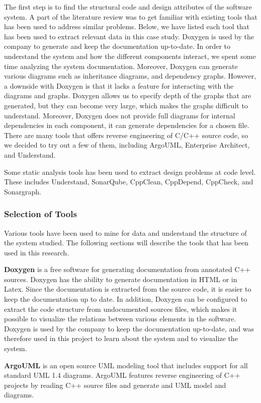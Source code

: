 The first step is to find the structural code and design attributes of the software system. A part of the literature review was to get familiar with existing tools that has been used to address similar problems. Below, we have listed each tool that has been used to extract relevant data in this case study. Doxygen is used by the company to generate and keep the documentation up-to-date. In order to understand the system and how the different components interact, we spent some time analyzing the system documentation. Moreover, Doxygen can generate various diagrams such as inheritance diagrams, and dependency graphs. However, a downside with Doxygen is that it lacks a feature for interacting with the diagrams and graphs. Doxygen allows us to specify depth of the graphs that are generated, but they can become very large, which makes the graphs difficult to understand. Moreover, Doxygen does not provide full diagrams for internal dependencies in each component, it can generate dependencies for a chosen file. There are many tools that offers reverse engineering of C/C++ source code, so we decided to try out a few of them, including ArgoUML, Enterprise Architect, and Understand. 

Some static analysis tools has been used to extract design problems at code level. These includes Understand, SonarQube, CppClean, CppDepend, CppCheck, and Sonargraph. 

\subsubsection{Selection of Tools}
Various tools have been used to mine for data and understand the structure of the system studied. The following sections will describe the tools that has been used in this research.

\textbf{Doxygen} is a free software for generating documentation from annotated C++ sources. Doxygen has the ability to generate documentation in HTML or in Latex. Since the documentation is extracted from the source code, it is easier to keep the documentation up to date. In addition, Doxygen can be configured to extract the code structure from undocumented sources files, which makes it possible to visualize the relations between various elements in the software. Doxygen is used by the company to keep the documentation up-to-date, and was therefore used in this project to learn about the system and to visualize the system.

\textbf{ArgoUML} is an open source UML modeling tool that includes support for all standard UML 1.4 diagrams\cite{argouml}. ArgoUML features reverse engineering of C++ projects by reading C++ source files and generate and UML model and diagrams. 

